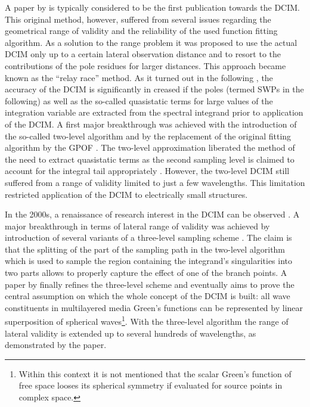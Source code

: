 A paper by \textcite{Fang1988} is typically considered to be the first
publication towards the \ac{DCIM}.
This original method, however, suffered from several issues regarding the
geometrical range of validity and the reliability of the used function fitting
algorithm.
As a solution to the range problem it was proposed to use the actual \ac{DCIM}
only up to a certain lateral observation distance and to resort to
the contributions of the pole residues for larger distances.
This approach became known as the \enquote{relay race} method.
As it turned out in the following \cite{Chow1991,Yang1991,Yang1992,Aksun1992},
the accuracy of the \ac{DCIM} is significantly in creased if the poles
(termed \acp{SWP} in the following) as well as the so-called quasistatic terms
for large values of the integration variable are extracted from the spectral
integrand prior to application of the \ac{DCIM}.
A first major breakthrough was achieved with the introduction of the so-called
two-level algorithm and by the replacement of the original fitting algorithm
by the \ac{GPOF} \cite{Dural1995,Aksun1995,Aksun1996,Hua1989,Sarkar1995}.
The two-level approximation liberated the method of the need to extract 
quasistatic terms as the second sampling level is claimed to account for
the integral tail appropriately \cite{IrsadiAksun2003,Aksun2005}.
However, the two-level \ac{DCIM} still suffered from a range of validity
limited to just a few wavelengths.
This limitation restricted application of the \ac{DCIM} to electrically small
structures.

In the 2000s, a renaissance of research interest in the \ac{DCIM} can be 
observed \cite{Aksun2009}.
A major breakthrough in terms of lateral range of validity was achieved
by introduction of several variants of a three-level sampling scheme
\cite{Michalski2007a}.
The claim is that the splitting of the part of the sampling path in the
two-level algorithm which is used to sample the region containing the
integrand's singularities into two parts allows to properly capture the effect
of one of the branch points.
A paper by \textcite{Alparslan2010} finally refines the three-level scheme and
eventually aims to prove the central assumption on which the whole concept of
the \ac{DCIM} is built: all wave constituents in multilayered media Green's
functions can be represented by linear superposition of spherical
waves\footnote{
	Within this context it is not mentioned that the scalar Green's function of 
	free space looses its spherical symmetry if evaluated for source points in 
	complex space.
}.
With the three-level algorithm the range of lateral validity is extended 
up to several hundreds of wavelengths, as demonstrated by the paper.

